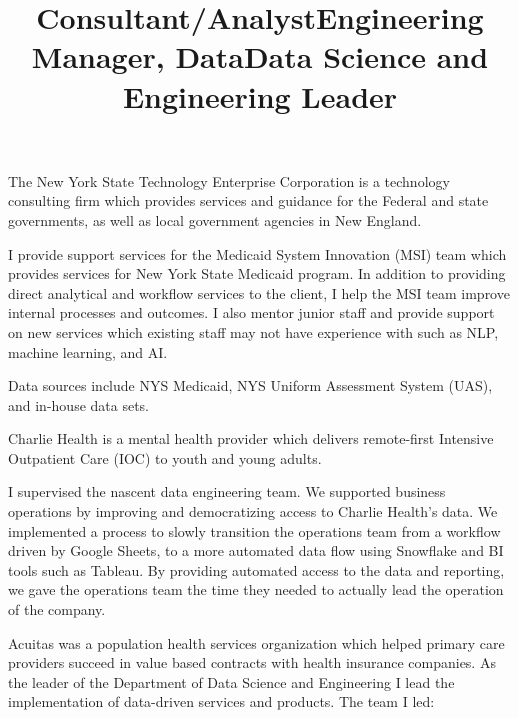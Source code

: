 \documentclass[line, mm, 10pt]{res}
\begin{document}
\begin{resume}
\begin{position}
  \end{position}
  
  \title{Consultant/Analyst}
  \begin{position}
    The New York State Technology Enterprise Corporation is a technology
    consulting firm which provides services and guidance for the Federal and
    state governments, as well as local government agencies in New England.

    I provide support services for the Medicaid System Innovation (MSI) team
    which provides services for New York State Medicaid program. In addition to
    providing direct analytical and workflow services to the client, I help the
    MSI team improve internal processes and outcomes. I also mentor junior staff
    and provide support on new services which existing staff may not have
    experience with such as NLP, machine learning, and AI.

    Data sources include NYS Medicaid, NYS Uniform Assessment System (UAS), and
    in-house data sets.
  \end{position}

  \title{Engineering Manager, Data}
  \begin{position}
    Charlie Health is a mental health provider which delivers
    remote-first Intensive Outpatient Care (IOC) to youth and young adults. 
    
    I supervised the nascent data engineering team. We supported business
    operations by improving and democratizing access to Charlie Health's data.
    We implemented a process to slowly transition the operations team from a
    workflow driven by Google Sheets, to a more automated data flow using
    Snowflake and BI tools such as Tableau. By providing automated access to the
    data and reporting, we gave the operations team the time they needed to
    actually lead the operation of the company. 
  \end{position}

  \title{Data Science and Engineering Leader}
  \begin{position}
    Acuitas was a population health services organization which helped primary
    care providers succeed in value based contracts with health insurance
    companies. As the leader of the Department of Data Science and Engineering I
    lead the implementation of data-driven services and products. The team I led:
    

\end{position}
\end{resume}
\end{document}
